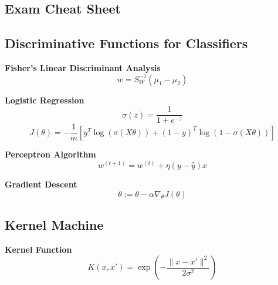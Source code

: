 \documentclass[8pt]{article}
\begin{document}
\begin{multicols}{2}
\section*{Exam Cheat Sheet}

\subsection*{Discriminative Functions for Classifiers}
\textbf{Fisher's Linear Discriminant Analysis}
\begin{equation}
    w = S_W^{-1} (\mu_1 - \mu_2)
\end{equation}

\textbf{Logistic Regression}
\begin{equation}
    \sigma(z) = \frac{1}{1 + e^{-z}}
\end{equation}
\begin{equation}
    J(\theta) = -\frac{1}{m} [y^T\log(\sigma(X\theta)) + (1-y)^T\log(1-\sigma(X\theta))]
\end{equation}

\textbf{Perceptron Algorithm}
\begin{equation}
    w^{(t+1)} = w^{(t)} + \eta (y - \hat{y}) x
\end{equation}

\textbf{Gradient Descent}
\begin{equation}
    \theta := \theta - \alpha \nabla_{\theta} J(\theta)
\end{equation}

\subsection*{Kernel Machine}
\textbf{Kernel Function}
\begin{equation}
    K(x, x') = \exp\left(-\frac{\|x - x'\|^2}{2\sigma^2}\right) %
\end{equation}

\end{multicols}
\end{document}
